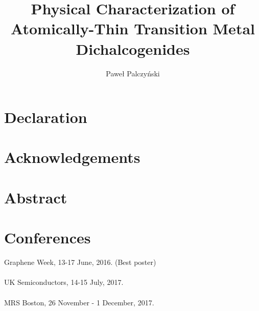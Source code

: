 \documentclass[12pt, a4paper]{report}
\author{Paweł Palczyński}
\title{Physical Characterization of Atomically-Thin Transition Metal Dichalcogenides}
\begin{document}


\section*{Declaration}

\newpage
\section*{Acknowledgements}

\newpage


\newpage
\section*{Abstract}

\newpage


\tableofcontents















\appendix
%

\section*{Conferences}

Graphene Week, 13-17 June, 2016. (Best poster)\\ \\
UK Semiconductors, 14-15 July, 2017.\\ \\
MRS Boston, 26 November - 1 December, 2017.


{}
\end{document}
